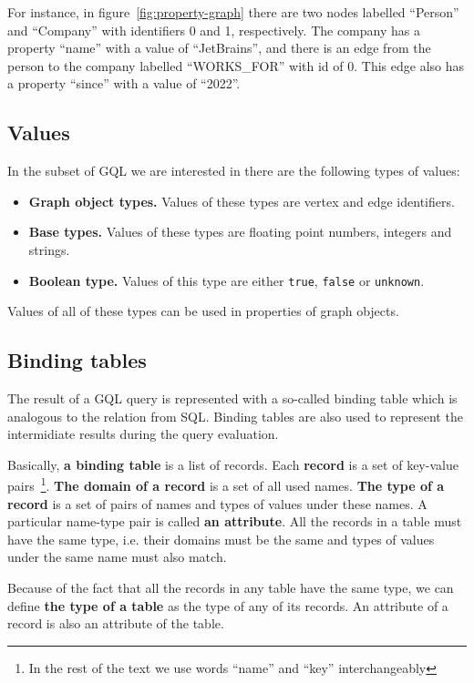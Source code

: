 \documentclass[14pt]{constructor-thesis}
\theoremstyle{definition}
\begin{document}
For instance, in figure~\ref{fig:property-graph} there are two nodes labelled ``Person'' and ``Company'' with identifiers 0 and 1, respectively. The company has a property ``name'' with a value of ``JetBrains'', and there is an edge from the person to the company labelled ``WORKS\_FOR'' with id of 0. This edge also has a property ``since'' with a value of ``2022''.

\subsection{Values}

In the subset of GQL we are interested in there are the following types of values:
\begin{itemize}
  \item \textbf{Graph object types.} Values of these types are vertex and edge identifiers.
  \item \textbf{Base types.} Values of these types are floating point numbers, integers and strings. 
  \item \textbf{Boolean type.} Values of this type are either \texttt{true}, \texttt{false} or \texttt{unknown}.
\end{itemize}

Values of all of these types can be used in properties of graph objects.

\subsection{Binding tables}

The result of a GQL query is represented with a so-called binding table which is analogous to the relation from SQL. Binding tables are also used to represent the intermidiate results during the query evaluation.

Basically, \textbf{a binding table} is a list of records. Each \textbf{record} is a set of key-value pairs~\footnote{In the rest of the text we use words ``name'' and ``key'' interchangeably}. \textbf{The domain of a record} is a set of all used names. \textbf{The type of a record}  is a set of pairs of names and types of values under these names. A particular name-type pair is called \textbf{an attribute}. All the records in a table must have the same type, i.e. their domains must be the same and types of values under the same name must also match.

Because of the fact that all the records in any table have the same type, we can define \textbf{the type of a table} as the type of any of its records. An attribute of a record is also an attribute of the table.
\end{document}
